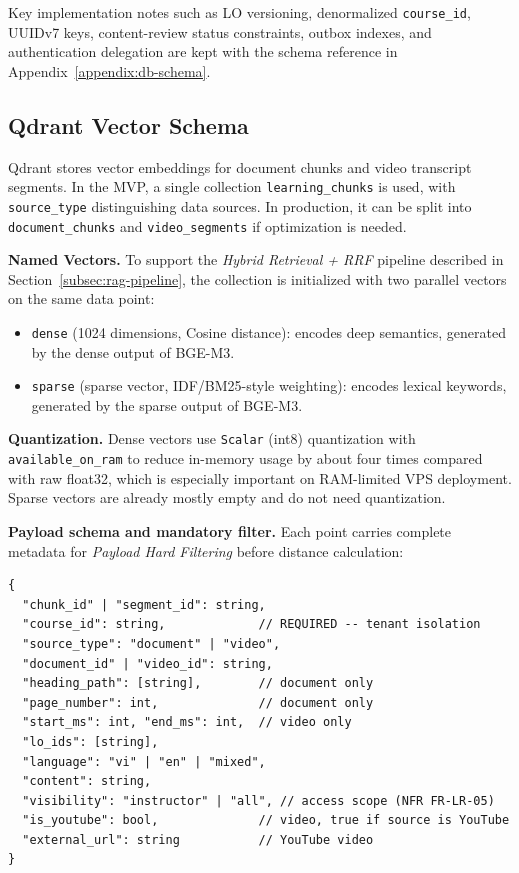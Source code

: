 Key implementation notes such as LO versioning, denormalized
\texttt{course\_id}, UUIDv7 keys, content-review status constraints,
outbox indexes, and authentication delegation are kept with the schema
reference in Appendix~\ref{appendix:db-schema}.

\subsection{Qdrant Vector Schema}
\label{subsec:qdrant-vector-schema}

Qdrant stores vector embeddings for document chunks and video transcript
segments. In the MVP, a single collection \texttt{learning\_chunks} is
used, with \texttt{source\_type} distinguishing data sources. In
production, it can be split into \texttt{document\_chunks} and
\texttt{video\_segments} if optimization is needed.

\textbf{Named Vectors.} To support the \emph{Hybrid Retrieval + RRF}
pipeline described in Section~\ref{subsec:rag-pipeline}, the collection
is initialized with
two parallel vectors on the same data point:

\begin{itemize}
    \item \texttt{dense} (1024 dimensions, Cosine distance): encodes deep
          semantics, generated by the dense output of BGE-M3.
    \item \texttt{sparse} (sparse vector, IDF/BM25-style weighting):
          encodes lexical keywords, generated by the sparse output of
          BGE-M3.
\end{itemize}

\textbf{Quantization.} Dense vectors use \texttt{Scalar} (int8)
quantization with \texttt{available\_on\_ram} to reduce in-memory usage
by about four times compared with raw float32, which is especially
important on RAM-limited VPS deployment. Sparse vectors are already mostly
empty and do not need quantization.

\textbf{Payload schema and mandatory filter.} Each point carries complete
metadata for \emph{Payload Hard Filtering} before distance calculation:

\begin{verbatim}
{
  "chunk_id" | "segment_id": string,
  "course_id": string,             // REQUIRED -- tenant isolation
  "source_type": "document" | "video",
  "document_id" | "video_id": string,
  "heading_path": [string],        // document only
  "page_number": int,              // document only
  "start_ms": int, "end_ms": int,  // video only
  "lo_ids": [string],
  "language": "vi" | "en" | "mixed",
  "content": string,
  "visibility": "instructor" | "all", // access scope (NFR FR-LR-05)
  "is_youtube": bool,              // video, true if source is YouTube
  "external_url": string           // YouTube video
}
\end{verbatim}


